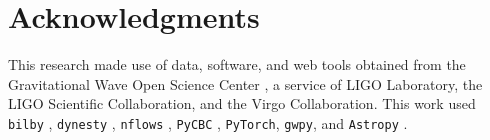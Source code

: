 \documentclass[twocolumn,linenumbers]{aastex701}
\begin{document}
\section*{Acknowledgments}

This research made use of data, software, and web tools obtained from the
Gravitational Wave Open Science Center \citep{Vallisneri2015Gwosc,
Abbott2021Gwosc}, a service of LIGO Laboratory, the LIGO Scientific
Collaboration, and the Virgo Collaboration. This work used
\texttt{bilby} \citep{Ashton2019Bilby, Romero2020Bilby2},
\texttt{dynesty} \citep{Speagle2020Dynesty}, \texttt{nflows}
\citep{nflows}, \texttt{PyCBC} \citep{Harry2020PyCBC}, \texttt{PyTorch},
\texttt{gwpy}, and \texttt{Astropy} \citep{astropy}.





\end{document}
